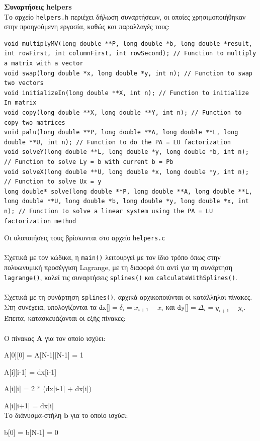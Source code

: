 \documentclass[a4paper, 14pt]{article}   %
\begin{document}
\textbf{Συναρτήσεις helpers}\\
	Το αρχείο \texttt{helpers.h} περιέχει δήλωση συναρτήσεων, οι οποίες χρησιμοποιήθηκαν στην προηγούμενη εργασία, καθώς και παραλλαγές τους:
\begin{lstlisting}
void multiplyMV(long double **P, long double *b, long double *result, int rowFirst, int columnFirst, int rowSecond); // Function to multiply a matrix with a vector
void swap(long double *x, long double *y, int n); // Function to swap two vectors
void initializeIn(long double **X, int n); // Function to initialize In matrix
void copy(long double **X, long double **Y, int n); // Function to copy two matrices
void palu(long double **P, long double **A, long double **L, long double **U, int n); // Function to do the PA = LU factorization
void solveY(long double **L, long double *y, long double *b, int n); // Function to solve Ly = b with current b = Pb
void solveX(long double **U, long double *x, long double *y, int n); // Function to solve Ux = y
long double* solve(long double **P, long double **A, long double **L, long double **U, long double *b, long double *y, long double *x, int n); // Function to solve a linear system using the PA = LU factorization method
\end{lstlisting}
Οι υλοποιήσεις τους βρίσκονται στο αρχείο \texttt{helpers.c}\\\\
Σχετικά με τον κώδικα, η \texttt{main()} λειτουργεί με τον ίδιο τρόπο όπως στην πολυωνυμική προσέγγιση Lagrange, με τη διαφορά ότι αντί για τη συνάρτηση \texttt{lagrange()}, καλεί τις συναρτήσεις \texttt{splines()} και \texttt{calculateWithSplines()}.\\\\
Σχετικά με τη συνάρτηση \texttt{splines()}, αρχικά αρχικοποιύνται οι κατάλληλοι πίνακες. Στη συνέχεια, υπολογίζονται τα $\texttt{dx[]} = δ_i = x_{i+1} - x_i$ και $\texttt{dy[]} = Δ_i = y_{i+1} - y_i$. Έπειτα, κατασκευάζονται οι εξής πίνακες:\\\\
O πίνακας $\mathbf{Α}$ για τον οποίο ισχύει:

Α[0][0] = Α[Ν-1][Ν-1] = 1

A[i][i-1] = dx[i-1]

A[i][i] = 2 * (dx[i-1] + dx[i])

A[i][i+1] = dx[i]\\
Το διάνυσμα-στήλη $\mathbf{b}$ για το οποίο ισχύει:

b[0] = b[Ν-1] = 0
\end{document}
